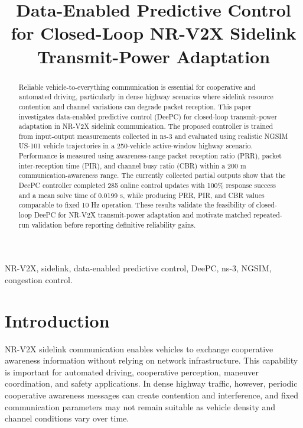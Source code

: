 \documentclass[conference]{IEEEtran}
\begin{document}
\title{Data-Enabled Predictive Control for Closed-Loop NR-V2X Sidelink Transmit-Power Adaptation}

\author{
}

\maketitle

\begin{abstract}
Reliable vehicle-to-everything communication is essential for cooperative and automated driving, particularly in dense highway scenarios where sidelink resource contention and channel variations can degrade packet reception. This paper investigates data-enabled predictive control (DeePC) for closed-loop transmit-power adaptation in NR-V2X sidelink communication. The proposed controller is trained from input-output measurements collected in ns-3 and evaluated using realistic NGSIM US-101 vehicle trajectories in a 250-vehicle active-window highway scenario. Performance is measured using awareness-range packet reception ratio (PRR), packet inter-reception time (PIR), and channel busy ratio (CBR) within a 200 m communication-awareness range. The currently collected partial outputs show that the DeePC controller completed 285 online control updates with 100\% response success and a mean solve time of 0.0199 s, while producing PRR, PIR, and CBR values comparable to fixed 10 Hz operation. These results validate the feasibility of closed-loop DeePC for NR-V2X transmit-power adaptation and motivate matched repeated-run validation before reporting definitive reliability gains.
\end{abstract}

\begin{IEEEkeywords}
NR-V2X, sidelink, data-enabled predictive control, DeePC, ns-3, NGSIM, congestion control.
\end{IEEEkeywords}

\section{Introduction}

NR-V2X sidelink communication enables vehicles to exchange cooperative awareness information without relying on network infrastructure. This capability is important for automated driving, cooperative perception, maneuver coordination, and safety applications. In dense highway traffic, however, periodic cooperative awareness messages can create contention and interference, and fixed communication parameters may not remain suitable as vehicle density and channel conditions vary over time.
\end{document}
